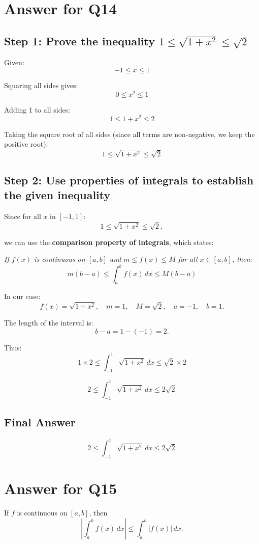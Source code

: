 \documentclass{article}
\begin{document}
\section*{Answer for Q14}

\subsection*{Step 1: Prove the inequality \(1 \leq \sqrt{1+x^2} \leq \sqrt{2}\)}
Given:
\[
-1 \leq x \leq 1
\]

Squaring all sides gives:
\[
0 \leq x^2 \leq 1
\]

Adding 1 to all sides:
\[
1 \leq 1 + x^2 \leq 2
\]

Taking the square root of all sides (since all terms are non-negative, we keep the positive root):
\[
1 \leq \sqrt{1+x^2} \leq \sqrt{2}
\]

\subsection*{Step 2: Use properties of integrals to establish the given inequality}

Since for all \(x\) in \([-1, 1]\):
\[
1 \leq \sqrt{1+x^2} \leq \sqrt{2},
\]

we can use the \textbf{comparison property of integrals}, which states:

\medskip
\noindent
\textit{If \(f(x)\) is continuous on \([a,b]\) and \(m \leq f(x) \leq M\) for all \(x \in [a,b]\), then:}
\[
m(b - a) \leq \int_a^b f(x) \, dx \leq M(b - a)
\]

\medskip
\noindent
In our case:
\[
f(x) = \sqrt{1+x^2}, \quad m = 1, \quad M = \sqrt{2}, \quad a = -1, \quad b = 1.
\]

The length of the interval is:
\[
b - a = 1 - (-1) = 2.
\]

Thus:
\[
1 \times 2 \leq \int_{-1}^1 \sqrt{1+x^2} \, dx \leq \sqrt{2} \times 2
\]

\[
2 \leq \int_{-1}^1 \sqrt{1+x^2} \, dx \leq 2\sqrt{2}
\]

\subsection*{Final Answer}
\[
\boxed{2 \leq \int_{-1}^1 \sqrt{1+x^2} \, dx \leq 2\sqrt{2}}
\]
\section*{Answer for Q15}
\begin{proposition}
If $f$ is continuous on $[a,b]$, then
\[
\left| \int_a^b f(x) \, dx \right| \leq \int_a^b |f(x)| \, dx.
\]
\end{proposition}
\end{document}
